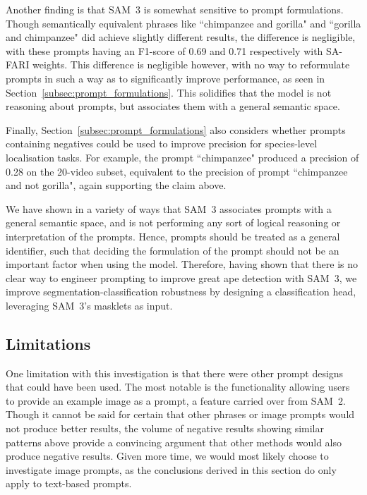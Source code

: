 \documentclass[author={Jacob Stephenson},
    degree={BSc},
    title={Robust Great Ape Species Detection in Wild Camera Trap Imagery with Promptable Concept Segmentation},
    unit={COMS30045},
    subtitle={}]{dissertation}
\begin{document}
Another finding is that SAM~3 is somewhat sensitive to prompt formulations. Though semantically equivalent phrases like ``chimpanzee and gorilla" and ``gorilla and chimpanzee" did achieve slightly different results, the difference is negligible, with these prompts having an F1-score of 0.69 and 0.71 respectively with SA-FARI weights. This difference is negligible however, with no way to reformulate prompts in such a way as to significantly improve performance, as seen in Section~\ref{subsec:prompt_formulations}. This solidifies that the model is not reasoning about prompts, but associates them with a general semantic space.

Finally, Section~\ref{subsec:prompt_formulations} also considers whether prompts containing negatives could be used to improve precision for species-level localisation tasks. For example, the prompt ``chimpanzee" produced a precision of 0.28 on the 20-video subset, equivalent to the precision of prompt ``chimpanzee and not gorilla", again supporting the claim above.

We have shown in a variety of ways that SAM~3 associates prompts with a general semantic space, and is not performing any sort of logical reasoning or interpretation of the prompts. Hence, prompts should be treated as a general identifier, such that deciding the formulation of the prompt should not be an important factor when using the model. Therefore, having shown that there is no clear way to engineer prompting to improve great ape detection with SAM~3, we improve segmentation-classification robustness by designing a classification head, leveraging SAM~3's masklets as input.

\subsection{Limitations}

One limitation with this investigation is that there were other prompt designs that could have been used. The most notable is the functionality allowing users to provide an example image as a prompt, a feature carried over from SAM~2. Though it cannot be said for certain that other phrases or image prompts would not produce better results, the volume of negative results showing similar patterns above provide a convincing argument that other methods would also produce negative results. Given more time, we would most likely choose to investigate image prompts, as the conclusions derived in this section do only apply to text-based prompts.
\end{document}
